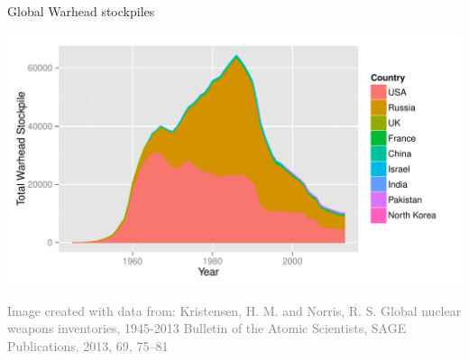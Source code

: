 \documentclass[presentation]{beamer}
\begin{document}
\begin{frame}[label=sec-1-8]{Global Warhead stockpiles}
\begin{varblock}[\textwidth]{}
\includegraphics[width=\textwidth]{images/all_countries}
\end{varblock}

\vspace{-0.4cm}
\fontsize{3pt}{3.6}\selectfont \textcolor{gray}{Image created with data from: Kristensen, H. M. and Norris, R. S. Global nuclear weapons inventories, 1945-2013 Bulletin of the Atomic Scientists, SAGE Publications, 2013, 69, 75–81}

\normalsize
\end{frame}
\end{document}

